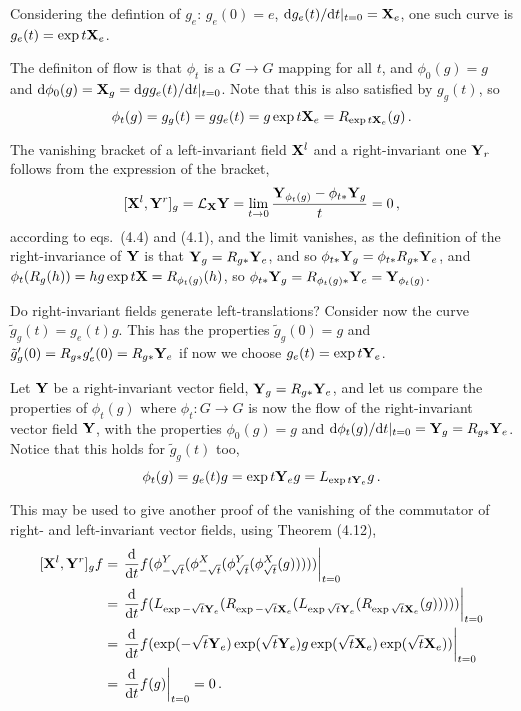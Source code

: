 \documentclass[a4paper,12pt]{article}
\def\d{\mathrm{d}}
\begin{document}
Considering the defintion of $g_e$: $g_e(0) = e$, $\d g_e(t) / \d t|_{t=0} = {\bf X}_e$, one such curve is $g_e(t) = \exp t {\bf X}_e$.

The definiton of flow is that $\phi_t$ is a $G\to G$ mapping for all $t$, and $\phi_0(g) = g$ and $\d \phi_0(g) = {\bf X}_g = \d g g_e(t) / \d t|_{t=0}$. Note that this is also satisfied by $g_g(t)$, so 
\[
 \phi_t(g) = g_g(t) = g g_e(t) = g \exp t{\bf X}_e = R_{\exp t {\bf X}_e}(g)\,.
\]

The vanishing bracket of a left-invariant field ${\bf X}^l$ and a right-invariant one ${\bf Y}_r$ follows from the expression of the bracket,
\[
 [{\bf X}^l, {\bf Y}^r ]_g =\mathcal{L}_{\bf X}{\bf Y} = \lim_{t\to 0} \frac{{\bf Y}_{\phi_t(g)} -\phi_{t*} {\bf Y}_g}{t} = 0\,,
\]
according to eqs.\ (4.4) and (4.1), and the limit vanishes, as the definition of the right-invariance of ${\bf Y}$ is that ${\bf Y}_g = R_{g*} {\bf Y}_e$, and so $\phi_{t*}{\bf Y}_g = \phi_{t*}R_{g*} {\bf Y}_e$, and $\phi_t(R_g(h)) = h g \exp t{\bf X} = R_{\phi_t(g)}(h)$, so $\phi_{t*}{\bf Y}_g = R_{\phi_t(g)*}{\bf Y}_e = {\bf Y}_{\phi_t(g)}$.


Do right-invariant fields generate left-translations? Consider now the curve $\tilde{g}_g(t) = g_e(t) g$. This has the properties $\tilde{g}_g(0) = g$ and ${\tilde{g}_g}'(0) = R_{g*}g_e'(0) = R_{g*}{\bf Y}_e$ if now we choose $g_e(t) = \exp t{\bf Y}_e$.

Let ${\bf Y}$ be a right-invariant vector field, ${\bf Y}_g = R_{g*}{\bf Y}_e$, and let us compare the properties of $\phi_t(g)$ where $\phi_t: G\to G$ is now the flow of the right-invariant vector field ${\bf Y}$, with the properties $\phi_0(g) = g$ and $\d \phi_t(g)/\d t|_{t=0} = {\bf Y}_g = R_{g*}{\bf Y}_e$. Notice that this holds for $\tilde{g}_g(t)$ too,
\[
 \phi_t(g) = g_e(t) g = \exp t{\bf Y}_e g = L_{\exp t {\bf Y}_e} g\,.
\]

This may be used to give another proof of the vanishing of the commutator of right- and left-invariant vector fields, using Theorem (4.12),
\[
\begin{aligned}{}
 [{\bf X}^l, {\bf Y}^r]_g f &= \left.\frac{\d}{\d t} f(\phi^Y_{-\sqrt{t}}(\phi^X_{-\sqrt{t}}(\phi^Y_{\sqrt{t}}(\phi^X_{\sqrt{t}}(g)))))\right|_{t=0}\\
 &= \left.\frac{\d}{\d t}f( L_{\exp-\sqrt{t}{\bf Y}_e}(R_{\exp-\sqrt{t}{\bf X}_e}(L_{\exp \sqrt{t}{\bf Y}_e}(R_{\exp\sqrt{t}{\bf X}_e}(g)))))\right|_{t=0}\\
 &= \left.\frac{\d}{\d t}f( \exp(-\sqrt{t}{\bf Y}_e)\exp(\sqrt{t}{\bf Y}_e) g \exp(\sqrt{t}{\bf X}_e)\exp(\sqrt{t}{\bf X}_e))\right|_{t=0}\\
 &=\left.\frac{\d}{\d t} f(g) \right|_{t=0} = 0\,.
\end{aligned}
\]
\end{document}
